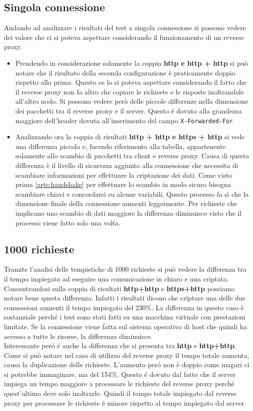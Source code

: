 \subsection{Singola connessione}
Andando ad analizzare i risultati del test a singola connessione si possono vedere dei valore che ci si poteva aspettare considerando il funzionamento di un reverse proxy.
\begin{itemize}
  \item Prendendo in considerazione solamente la coppia \textbf{http e http + http} si può notare che il risultato della seconda configurazione è praticamente doppio rispetto alla prima. Questo ce lo si poteva aspettare considerando il fatto che il reverse proxy non fa altro che copiare le richieste e le risposte inoltrandole all'altro nodo. Si possono vedere però delle piccole differenze nella dimensione dei pacchetti tra il reverse proxy e il server. Questo é dovuto alla grandezza maggiore dell'header dovuta all'inserimento del campo \texttt{X-Forwarded-For}.
  \item Analizzando ora la coppia di risultati \textbf{http + http e https + http} si vede una differenza piccola e, facendo riferimento alla tabella, appartenente solamente allo scambio di pacchetti tra client e reverse proxy. Causa di questa differenza è il livello di sicurezza aggiunto alla connessione che necessita di scambiare informazioni per effettuare la criptazione dei dati. Come visto prima \ref{arte:handshake} per effettuare lo scambio in modo sicuro bisogna scambiare chiavi e concordarsi su alcune variabili. Questo processo fa sì che la dimensione finale della connessione aumenti leggermente. Per richieste che implicano uno scambio di dati maggiore la differenza diminuisce visto che il processo viene fatto solo una volta.
\end{itemize}

\subsection{1000 richieste}
Tramite l'analisi delle tempistiche di 1000 richieste si può vedere la differenza tra il tempo impiegato ad eseguire una comunicazione in chiaro e una criptata. Concentrandosi sulla coppia di risultati \textbf{http+http} e \textbf{https+http} possiamo notare bene questa differenza. Infatti i risultati dicono che criptare una delle due connessioni aumenti il tempo impiegato del 230\%. La differenza in questo caso è sostanziale perché i test sono stati fatti su una macchina virtuale con prestazioni limitate. Se la connessione viene fatta sul sistema operativo di host che quindi ha accesso a tutte le risorse, la differenza diminuisce.\\
Interessante peró é anche la differenza che si presenta tra \textbf{http} e \textbf{http+http}. Come si può notare nel caso di utilizzo del reverse proxy il tempo totale aumenta, causa la duplicazione delle richieste. L'aumento peró non è doppio come magari ci si potrebbe immaginare, ma del 154\%. Questo é dovuto dal fatto che il server impiega un tempo maggiore a processare le richieste del reverse proxy perché quest'ultimo deve solo inoltrarle. Quindi il tempo totale impiegato dal reverse proxy per processare le richieste é minore rispetto al tempo impiegato dal server.
